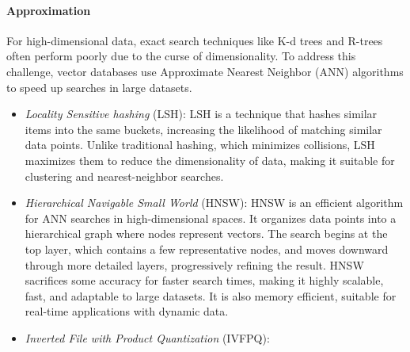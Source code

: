 \paragraph*{Approximation}
For high-dimensional data, exact search techniques like K-d trees and R-trees often perform poorly due to the curse of dimensionality.
To address this challenge, vector databases use Approximate Nearest Neighbor (ANN) algorithms to speed up searches in large datasets.
\begin{itemize}
    \item \textit{Locality Sensitive hashing} (LSH):  LSH is a technique that hashes similar items into the same buckets, increasing the likelihood of matching similar data points. 
        Unlike traditional hashing, which minimizes collisions, LSH maximizes them to reduce the dimensionality of data, making it suitable for clustering and nearest-neighbor searches.
    \item \textit{Hierarchical Navigable Small World} (HNSW): HNSW is an efficient algorithm for ANN searches in high-dimensional spaces. 
        It organizes data points into a hierarchical graph where nodes represent vectors. 
        The search begins at the top layer, which contains a few representative nodes, and moves downward through more detailed layers, progressively refining the result. 
        HNSW sacrifices some accuracy for faster search times, making it highly scalable, fast, and adaptable to large datasets. 
        It is also memory efficient, suitable for real-time applications with dynamic data.
    \item \textit{Inverted File with Product Quantization} (IVFPQ):
\end{itemize}